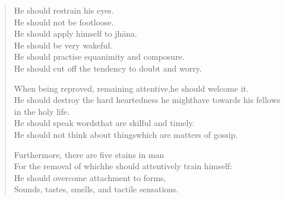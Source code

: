 \begin{verse}

 He should restrain his eyes.\\
He should not be footloose.\\
He should apply himself to jhāna.\\
He should be very wakeful.\\
He should practise equanimity and composure.\\
He should cut off the tendency to doubt and worry.


 When being reproved, remaining attentive,\newline he should welcome it.\\
He should destroy the hard heartedness he might\newline have towards his fellows in the holy life.\\
He should speak words\newline that are skilful and timely.\\
He should not think about things\newline which are matters of gossip.


 Furthermore, there are five stains in man\\
For the removal of which\newline he should attentively train himself:\\
He should overcome attachment to forms,\\
Sounds, tastes, smells, and tactile sensations.


\end{verse}
